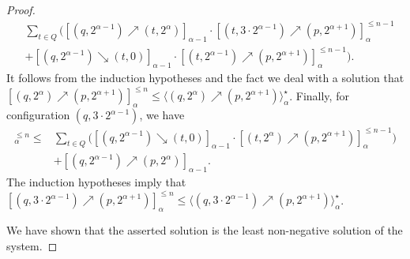 \documentclass[a4paper,UKenglish,cleveref,autoref,thm-restate,colorlinks]{lipics-v2021}
\newcommand{\indexLast}{n}
\newcommand{\ocStateSpace}{Q}
\newcommand{\ocState}{q}
\newcommand{\ocStateB}{p}
\newcommand{\ocStateC}{t}
\newcommand{\powerIndex}{\alpha}
\newcommand{\upProba}[5]{[(#1,#2)\nearrow{}(#3,#4)]_{#5}}
\newcommand{\downProba}[5]{[(#1,#2)\searrow{}(#3,#4)]_{#5}}
\newcommand{\upProbaVar}[5]{\langle (#1,#2)\nearrow{}(#3,#4)\rangle_{#5}}
\begin{document}
\begin{proof}
\begin{align*}
    &
      \sum_{\ocStateC\in\ocStateSpace}\bigg(
      \upProba{\ocState}{2^{\powerIndex-1}}{\ocStateC}{2^{\powerIndex}}{\powerIndex-1}
      \cdot 
      \upProba{\ocStateC}{3\cdot2^{\powerIndex-1}}{\ocStateB}{2^{\powerIndex+1}}{\powerIndex}^{\leq\indexLast-1} \\
    &
      +
      \downProba{\ocState}{2^{\powerIndex-1}}{\ocStateC}{0}{\powerIndex-1}
      \cdot 
      \upProba{\ocStateC}{2^{\powerIndex-1}}{\ocStateB}{2^{\powerIndex+1}}{\powerIndex}^{\leq\indexLast-1}
      \bigg).
  \end{align*}
  It follows from the induction hypotheses and the fact we deal with a solution that $\upProba{\ocState}{2^{\powerIndex}}{\ocStateB}{2^{\powerIndex+1}}{\powerIndex}^{\leq\indexLast} \leq \upProbaVar{\ocState}{2^{\powerIndex}}{\ocStateB}{2^{\powerIndex+1}}{\powerIndex}^\star$.
  Finally, for configuration $(\ocState, 3\cdot 2^{\powerIndex-1})$, we have
  \begin{align*}
    \upProba{\ocState}{3\cdot 2^{\powerIndex-1}}{\ocStateB}{2^{\powerIndex+1}}{\powerIndex}^{\leq\indexLast} \leq
    &
      \sum_{\ocStateC\in\ocStateSpace}\bigg(
      \downProba{\ocState}{2^{\powerIndex-1}}{\ocStateC}{0}{\powerIndex-1}
      \cdot
      \upProba{\ocStateC}{2^{\powerIndex}}{\ocStateB}{2^{\powerIndex+1}}{\powerIndex}^{\leq\indexLast-1}
      \bigg)
    \\
    &
      + \upProba{\ocState}{2^{\powerIndex-1}}{\ocStateB}{2^{\powerIndex}}{\powerIndex-1}.
  \end{align*}
  The induction hypotheses imply that $\upProba{\ocState}{3\cdot 2^{\powerIndex-1}}{\ocStateB}{2^{\powerIndex+1}}{\powerIndex}^{\leq\indexLast}\leq \upProbaVar{\ocState}{3\cdot 2^{\powerIndex-1}}{\ocStateB}{2^{\powerIndex+1}}{\powerIndex}^\star$.

  We have shown that the asserted solution is the least non-negative solution of the system.
\end{proof}
\end{document}
